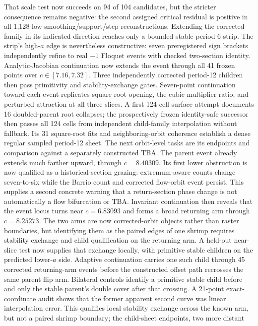 That scale test now succeeds on 94 of 104 candidates, but the stricter
consequence remains negative: the second assigned critical residual is
positive in all 1,128 low-smoothing/support/step reconstructions.  Extending
the corrected family in its indicated direction reaches only a bounded stable
period-6 strip.  The strip's high-$a$ edge is nevertheless constructive:
seven preregistered sign brackets independently refine to real $-1$ Floquet
events with checked two-section identity.  Analytic-Jacobian continuation now
extends the event through all 41 frozen points over $c\in[7.16,7.32]$.
Three independently corrected period-12 children then pass primitivity and
stability-exchange gates.  Seven-point continuation toward each event
replicates square-root opening, the cubic multiplier ratio, and perturbed
attraction at all three slices.  A first 124-cell surface attempt documents
16 doubled-parent root collapses; the prospectively frozen identity-safe
successor then passes all 124 cells from independent child-family interpolation
without fallback.  Its 31 square-root fits and neighboring-orbit coherence
establish a dense regular sampled period-12 sheet.  The next orbit-level tasks
are its endpoints and comparison against a separately constructed TBA.  The
parent event already extends much farther upward, through $c=8.40309$.  Its
first lower obstruction is now qualified as a historical-section grazing:
extremum-aware counts change seven-to-six while the Barrio count and corrected
flow-orbit event persist.  This supplies a second concrete warning that a
return-section phase change is not automatically a flow bifurcation or TBA.
Invariant continuation then reveals that the event locus turns near
$c=6.83093$ and forms a broad returning arm through $c=8.25273$.  The two arms
are now corrected-orbit objects rather than raster boundaries, but identifying
them as the paired edges of one shrimp requires stability exchange and child
qualification on the returning arm.  A held-out near-slice test now supplies
that exchange locally, with primitive stable children on the predicted
lower-$a$ side. Adaptive continuation carries one such child through 45 corrected
returning-arm events before the constructed offset path recrosses the same
parent flip arm.
Bilateral controls identify a primitive stable child before and only the
stable parent's double cover after that crossing. A 21-point exact-coordinate
audit shows that the former apparent second curve was linear interpolation
error. This qualifies local stability exchange across the known arm, but not
a paired shrimp boundary; the child-sheet endpoints, two more distant
